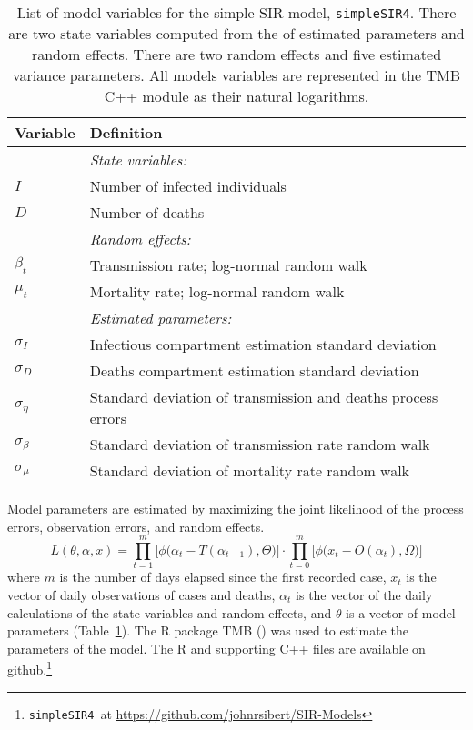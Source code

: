 \documentclass[12pt,letterpaper]{article}
\newcommand\SSm{{\tt simpleSIR4}}
\begin{document}
\begin{table}
\caption{List of model variables for the simple SIR model, \SSm.
There are two state variables computed from the of estimated
parameters and random effects.
There are two random effects and five estimated variance parameters.
All models variables are represented in the TMB C++ module as their
natural logarithms.
}
\label{tab:allvars1}
\begin{center}
\begin{tabular}{ll}
\hline
Variable & Definition\\
\hline
\hline
       & {\it State variables:}\\
$I$      & Number of infected individuals\\
$D$      & Number of deaths\\
       & {\it Random effects:}\\
$\beta_t$ & Transmission rate; log-normal random walk\\
$\mu_t$   & Mortality rate; log-normal random walk\\
       & {\it Estimated parameters:}\\
$\sigma_I$ & Infectious compartment estimation standard deviation\\
$\sigma_D$ & Deaths compartment estimation standard deviation\\
$\sigma_\eta$ & Standard deviation of transmission and deaths process errors\\
$\sigma_\beta$ & Standard deviation of transmission rate random walk\\
$\sigma_\mu$ & Standard deviation of mortality rate random walk\\
\hline
\end{tabular}
\end{center}
\end{table}

Model parameters are estimated by
maximizing the joint likelihood of the process errors, observation
errors, and random effects.
\begin{equation}
\label{eqn:likelihood}
L(\theta,\alpha,x)=
\prod^m_{t=1}\big[\phi\big(\alpha_t-T(\alpha_{t-1}), \Theta\big)\big]\cdot
\prod^m_{t=0}\big[\phi\big(x_t-O(\alpha_t), \Omega\big)\big]
\end{equation}
where $m$ is the number of days elapsed since the first recorded case,
$x_t$ is the vector of daily observations of cases and deaths,
$\alpha_t$ is the vector of the daily calculations of the state
variables and random effects,
and $\theta$ 
is a vector of model parameters (Table~\ref{tab:allvars1}).
The R package TMB (\cite{TMB0000}) was used to 
estimate the parameters of the model. 
The R and supporting C++ files are available on 
github.\footnote{\SSm~at \url{https://github.com/johnrsibert/SIR-Models}}
\end{document}
